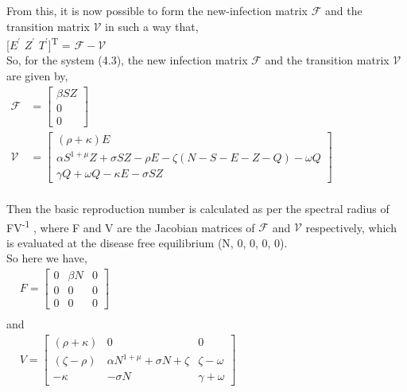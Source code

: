 From this, it is now possible to form the new-infection matrix $ \mathcal{F} $ and the transition matrix $ \mathcal{V} $ in such a way that,  \\

[$E^\prime$ $Z^\prime$ $T^\prime$]\textsuperscript{T} = $ \mathcal{F} - \mathcal{V} $ \\

So, for the system (4.3), the new infection matrix $ \mathcal{F} $ and the transition matrix $ \mathcal{V} $ are given by, \\

$
\begin{aligned}
\mathcal{F} &=\left[\begin{array}{c}
\beta S Z \\
0 \\
0
\end{array}\right] \\
\mathcal{V} &=\left[\begin{array}{c}
(\rho+\kappa) E \\
\alpha S^{1+\mu} Z+\sigma S Z-\rho E-\zeta(N-S-E-Z-Q)-\omega Q \\
\gamma Q+\omega Q-\kappa E-\sigma S Z
\end{array}\right]
\end{aligned}
$
\\
\\

Then the basic reproduction number is calculated as per the spectral radius of FV\textsuperscript{-1} , where F and V are the Jacobian matrices of $ \mathcal{F} $ and $ \mathcal{V} $ respectively, which is evaluated at the disease free equilibrium (N, 0, 0, 0, 0). \\

So here we have, \\

$
\begin{aligned}
&F=\left[\begin{array}{ccc}
0 & \beta N & 0 \\
0 & 0 & 0 \\
0 & 0 & 0
\end{array}\right] \\
\end{aligned}
$
\\

and \\

$
\begin{aligned}
&V=\left[\begin{array}{ccc}
(\rho+\kappa) & 0 & 0 \\
(\zeta-\rho) & \alpha N^{1+\mu}+\sigma N+\zeta & \zeta-\omega \\
-\kappa & -\sigma N & \gamma+\omega
\end{array}\right]
\end{aligned}
$
\\

